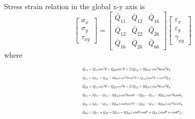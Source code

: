 Stress strain relation in the global x-y axis is
\begin{equation}
	\label{equ:stress-strain}
	\left[\begin{array}{l}
			\sigma _{x} \\ 
			\sigma _{y} \\
			\tau_{xy}
			\end{array}
	\right]=
	\left[\begin{array}{lll}
			\bar{Q}_{11} & \bar{Q}_{12} & \bar{Q}_{16}\\ 
			\bar{Q}_{12} & \bar{Q}_{22} & \bar{Q}_{26} \\
			\bar{Q}_{16} & \bar{Q}_{26} &\bar{Q}_{66}
		\end{array}
	 \right]
	 \left[\begin{array}{l}
			 \varepsilon_{x} \\ 
	 		 \varepsilon_{y} \\ 
	 		 \gamma_{x y}
	 		\end{array}
	\right] 
\end{equation}
where
\begin{equation}
	\begin{array}{l}
		\resizebox{.35\textwidth}{!}{$\bar{Q}_{11}=Q_{11} cos^{4}\theta+Q_{22} sin^{4}\theta+2\left(Q_{12}+2
		Q_{66}\right) sin^{2}\theta cos^{2}\theta$}\textstyle{,} \\
		\resizebox{.35\textwidth}{!}{$\bar{Q}_{12}=\left(Q_{11}+Q_{22}-4 Q_{66}\right) sin^{2}\theta
			cos^{2}\theta+Q_{12}\left(cos^{4}\theta+sin^{2}\theta \right)$} \textstyle{,}\\
		\resizebox{.35\textwidth}{!}{$\bar{Q}_{22}=Q_{11} sin^{4}\theta+Q_{22} cos^{4}\theta+2\left(Q_{12}+2
				Q_{66}\right) sin^{2}\theta cos^{2}\theta$}\textstyle{,} \\
		\resizebox{.40\textwidth}{!}{$\bar{Q}_{16}=\left(Q_{11}-Q_{12}-2
			Q_{66}\right) cos^{3}\theta
			sin\theta-\left(Q_{22}-Q_{12}-2Q_{66}\right) sin^{3}\theta cos\theta$} \textstyle{,}\\ 
		\resizebox{.40\textwidth}{!}{$\bar{Q}_{26}=\left(Q_{11}-Q_{12}-2
			Q_{66}\right) cos\theta sin^{3}\theta-\left(Q_{22}-Q_{12}-2
			Q_{66}\right)cos^{3}\theta sin\theta$} \textstyle{,}\\ 
		\resizebox{.40\textwidth}{!}	{$\bar{Q}_{66}=\left(Q_{11}+Q_{22}-2 Q_{12}-2 Q_{66}\right)
			sin\theta^{2}cos\theta^{2}+Q_{66}\left(sin\theta^{4}+cos\theta^{4}\right)$}\textstyle{.}\\
	\end{array}
\end{equation}

